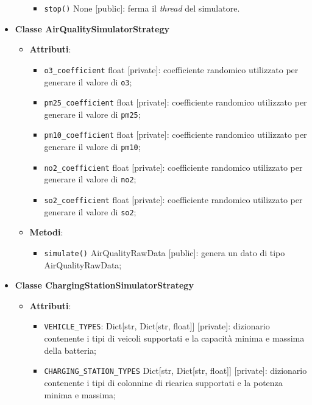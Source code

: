 \begin{itemize}
\begin{itemize}
\begin{itemize}
			            \item \texttt{stop()} None [public]: ferma il \textit{thread} del simulatore.
		            \end{itemize}
	      \end{itemize}
	\item \textbf{Classe AirQualitySimulatorStrategy}
	      \begin{itemize}
		      \item \textbf{Attributi}:
		            \begin{itemize}
			            \item \texttt{o3\_coefficient} float [private]: coefficiente randomico utilizzato per generare il valore di \texttt{o3};
			            \item \texttt{pm25\_coefficient} float [private]: coefficiente randomico utilizzato per generare il valore di \texttt{pm25};
			            \item \texttt{pm10\_coefficient} float [private]: coefficiente randomico utilizzato per generare il valore di \texttt{pm10};
			            \item \texttt{no2\_coefficient} float [private]: coefficiente randomico utilizzato per generare il valore di \texttt{no2};
			            \item \texttt{so2\_coefficient} float [private]: coefficiente randomico utilizzato per generare il valore di \texttt{so2};
		            \end{itemize}
		      \item \textbf{Metodi}:
		            \begin{itemize}
			            \item \texttt{simulate()} AirQualityRawData [public]: genera un dato di tipo AirQualityRawData;
		            \end{itemize}
	      \end{itemize}
	\item \textbf{Classe ChargingStationSimulatorStrategy}
	      \begin{itemize}
		      \item \textbf{Attributi}:
		            \begin{itemize}
			            \item \texttt{VEHICLE\_TYPES}: Dict[str, Dict[str, float]] [private]: dizionario contenente i tipi di veicoli supportati e la capacità minima e massima della batteria;
			            \item \texttt{CHARGING\_STATION\_TYPES} Dict[str, Dict[str, float]] [private]: dizionario contenente i tipi di colonnine di ricarica supportati e la potenza minima e massima;

\end{itemize}
\end{itemize}
\end{itemize}
